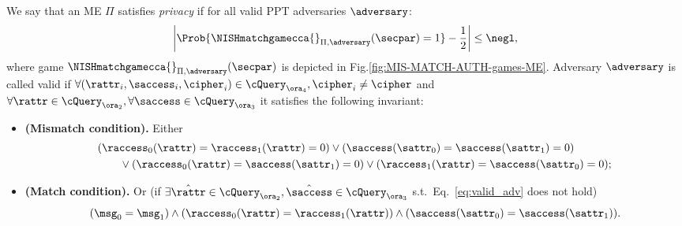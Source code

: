 \begin{definition}[Privacy of ME]\label{def:DNISHmatchsecurity}
    We say that an ME $\Pi$ satisfies {\em privacy} if for all valid PPT adversaries $\adversary$:
    \[
        \left\lvert \Prob{\NISHmatchgamecca{}_{\Pi, \adversary}(\secpar) = 1} - \frac{1}{2} \right\rvert \leq \negl,
    \]
    where game $\NISHmatchgamecca{}_{\Pi, \adversary}(\secpar)$ is depicted in Fig.\ref{fig:MIS-MATCH-AUTH-games-ME}.
    Adversary $\adversary$ is called valid if $\forall (\rattr_i, \saccess_i, \cipher_i) \in \cQuery_{\ora_4}, \cipher_i \ne \cipher$ and $\forall \rattr \in \cQuery_{\ora_2}, \forall \saccess \in \cQuery_{\ora_3}$ it satisfies the following invariant:
    \begin{itemize}
        \item \textbf{(Mismatch condition).} Either
              \begin{align}
                   & (\raccess_0(\rattr) = \raccess_1(\rattr)=0) \lor (\saccess(\sattr_0) = \saccess(\sattr_1)=0) \nonumber                         \\
                   & \qquad \lor (\raccess_0(\rattr) = \saccess(\sattr_1)=0) \lor (\raccess_1(\rattr) = \saccess(\sattr_0)=0); \label{eq:valid_adv}
              \end{align}
        \item \textbf{(Match condition).} Or (if $\exists\hat\rattr \in \cQuery_{\ora_2}, \hat\saccess \in \cQuery_{\ora_3}$ s.t.\ Eq.~\eqref{eq:valid_adv} does not hold)
              \[
                  (\msg_0 = \msg_1) \land (\raccess_0(\rattr) =\raccess_1(\rattr)) \land (\saccess(\sattr_0) = \saccess(\sattr_1)).
              \]
    \end{itemize}
\end{definition}